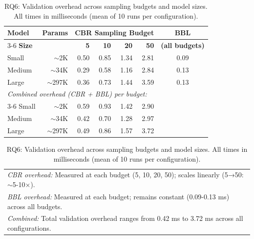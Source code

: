\begin{table}[t]
\centering
\caption{RQ6: Validation overhead across sampling budgets and model sizes. All times in milliseconds (mean of 10 runs per configuration).}
\label{tab:rq6-overhead-full}
\small
\setlength{\tabcolsep}{5pt}
\begin{tabular}{l@{\hspace{8pt}}r@{\hspace{12pt}}rrrr@{\hspace{8pt}}c}
\toprule
\textbf{Model} & \textbf{Params} & \multicolumn{4}{c}{\textbf{CBR Sampling Budget}} & \textbf{BBL} \\
\cmidrule(lr){3-6}
\textbf{Size} & & \textbf{5} & \textbf{10} & \textbf{20} & \textbf{50} & \textbf{(all budgets)} \\
\midrule
Small   & $\sim$2K   & 0.50 & 0.85 & 1.34 & 2.81 & 0.09 \\
Medium  & $\sim$34K  & 0.29 & 0.58 & 1.16 & 2.84 & 0.13 \\
Large   & $\sim$297K & 0.36 & 0.73 & 1.44 & 3.59 & 0.13 \\
\midrule
\multicolumn{7}{l}{\textit{Combined overhead (CBR + BBL) per budget:}} \\
\cmidrule(lr){3-6}
Small   & $\sim$2K   & 0.59 & 0.93 & 1.42 & 2.90 & \\
Medium  & $\sim$34K  & 0.42 & 0.70 & 1.28 & 2.97 & \\
Large   & $\sim$297K & 0.49 & 0.86 & 1.57 & 3.72 & \\
\bottomrule
\end{tabular}
\vspace{2mm}
\begin{tabular}{@{}l@{}}
\footnotesize
\textit{CBR overhead:} Measured at each budget (5, 10, 20, 50); scales linearly (5→50: $\sim$5-10×). \\
\footnotesize
\textit{BBL overhead:} Measured at each budget; remains constant (0.09-0.13 ms) across all budgets. \\
\footnotesize
\textit{Combined:} Total validation overhead ranges from 0.42 ms to 3.72 ms across all configurations.
\end{tabular}
\end{table}
